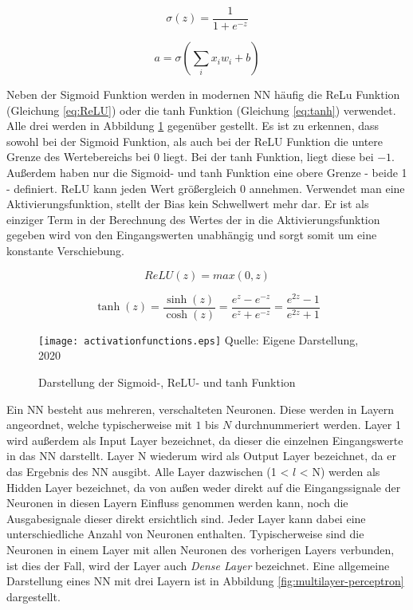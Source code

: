 \begin{equation} \label{eq:sigmoid}
    \sigma (z) =  \frac{1}{1+e^{-z}}
\end{equation}

\begin{equation} \label{eq:outputNeuron}
    a = \sigma (\sum_{i}{x_i w_i + b})
\end{equation}

Neben der Sigmoid Funktion werden in modernen \ac{NN} häufig die ReLu Funktion (Gleichung \ref{eq:ReLU}) oder die tanh Funktion (Gleichung \ref{eq:tanh}) verwendet. Alle drei werden in Abbildung \ref{fig:activationfunctions} gegenüber gestellt. Es ist zu erkennen, dass sowohl bei der Sigmoid Funktion, als auch bei der ReLU Funktion die untere Grenze des Wertebereichs bei $0$ liegt. Bei der tanh Funktion, liegt diese bei $-1$. Außerdem haben nur die Sigmoid- und tanh Funktion eine obere Grenze - beide 1 - definiert. ReLU kann jeden Wert größergleich $0$ annehmen. Verwendet man eine Aktivierungsfunktion, stellt der Bias kein Schwellwert mehr dar. Er ist als einziger Term in der Berechnung des Wertes der in die Aktivierungsfunktion gegeben wird von den Eingangswerten unabhängig und sorgt somit um eine konstante Verschiebung.

\begin{equation} \label{eq:ReLU}
    ReLU(z) = max(0,z)
\end{equation}

\begin{equation} \label{eq:tanh}
    \tanh(z) = \frac{\sinh(z)}{\cosh(z)} = \frac {e^z - e^{-z}} {e^z + e^{-z}}
  = \frac{e^{2z} - 1} {e^{2z} + 1}
\end{equation}

\begin{figure}[t]
    \centering
    \caption[]{Darstellung der Sigmoid-, ReLU- und tanh Funktion}
	\label{fig:activationfunctions}
    \texttt{[image: activationfunctions.eps]}
    Quelle: Eigene Darstellung, 2020
\end{figure}

Ein \ac{NN} besteht aus mehreren, verschalteten Neuronen. Diese werden in Layern angeordnet, welche typischerweise mit $1$ bis $N$ durchnummeriert werden. Layer 1 wird außerdem als Input Layer bezeichnet, da dieser die einzelnen Eingangswerte in das \ac{NN} darstellt. Layer N wiederum wird als Output Layer bezeichnet, da er das Ergebnis des \ac{NN} ausgibt. Alle Layer dazwischen (1 < $l$ < N) werden als Hidden Layer bezeichnet, da von außen weder direkt auf die Eingangssignale der Neuronen in diesen Layern Einfluss genommen werden kann, noch die Ausgabesignale dieser direkt ersichtlich sind. Jeder Layer kann dabei eine unterschiedliche Anzahl von Neuronen enthalten. Typischerweise sind die Neuronen in einem Layer mit allen Neuronen des vorherigen Layers verbunden, ist dies der Fall, wird der Layer auch \textit{Dense Layer} bezeichnet. Eine allgemeine Darstellung eines \ac{NN} mit drei Layern ist in Abbildung \ref{fig:multilayer-perceptron} dargestellt.

